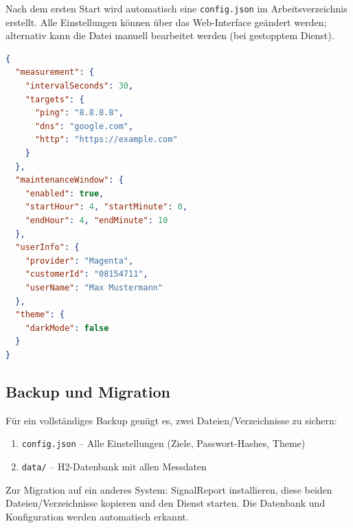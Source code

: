 Nach dem ersten Start wird automatisch eine \texttt{config.json} im Arbeitsverzeichnis
erstellt. Alle Einstellungen können über das Web-Interface geändert werden; alternativ
kann die Datei manuell bearbeitet werden (bei gestopptem Dienst).

\begin{lstlisting}[language=json, caption={Beispiel config.json (Auszug)}]
{
  "measurement": {
    "intervalSeconds": 30,
    "targets": {
      "ping": "8.8.8.8",
      "dns": "google.com",
      "http": "https://example.com"
    }
  },
  "maintenanceWindow": {
    "enabled": true,
    "startHour": 4, "startMinute": 0,
    "endHour": 4, "endMinute": 10
  },
  "userInfo": {
    "provider": "Magenta",
    "customerId": "08154711",
    "userName": "Max Mustermann"
  },
  "theme": {
    "darkMode": false
  }
}
\end{lstlisting}

\subsection{Backup und Migration}

Für ein vollständiges Backup genügt es, zwei Dateien/Verzeichnisse zu sichern:

\begin{enumerate}
  \item \texttt{config.json} -- Alle Einstellungen (Ziele, Passwort-Hashes, Theme)
  \item \texttt{data/} -- H2-Datenbank mit allen Messdaten
\end{enumerate}

Zur Migration auf ein anderes System: SignalReport installieren, diese beiden
Dateien/Verzeichnisse kopieren und den Dienst starten. Die Datenbank und Konfiguration
werden automatisch erkannt.
